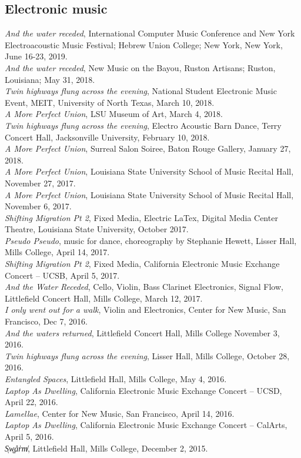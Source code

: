 \documentclass[10pt, a4paper]{article}
\newcommand{\years}[1]{\marginnote{\scriptsize #1}}
\begin{document}
\subsection*{Electronic music}
\years{2019} \textit{And the water receded}, International Computer Music Conference and New York Electroacoustic Music Festival; Hebrew Union College; New York, New York, June 16-23, 2019. \\
\years{2018} \textit{And the water receded}, New Music on the Bayou, Ruston Artisans; Ruston, Louisiana; May 31, 2018. \\  
\textit{Twin highways flung across the evening}, National Student Electronic Music Event, MEIT, University of North Texas, March 10, 2018. \\
\textit{A More Perfect Union}, LSU Museum of Art, March 4, 2018. \\
\textit{Twin highways flung across the evening}, Electro Acoustic Barn Dance, Terry Concert Hall, Jacksonville University, February 10, 2018. \\
\textit{A More Perfect Union}, Surreal Salon Soiree, Baton Rouge Gallery, January 27, 2018.\\
\years{2017}\textit{A  More Perfect Union}, Louisiana State University School of Music Recital Hall, November 27, 2017. \\
\textit{A More Perfect Union}, Louisiana State University School of Music Recital Hall, November 6, 2017.\\
\textit{Shifting Migration Pt 2}, Fixed Media, Electric LaTex, Digital Media Center Theatre, Louisiana State University, October 2017.\\
\textit{Pseudo Pseudo}, music for dance, choreography by Stephanie Hewett, Lisser Hall, Mills College, April 14, 2017. \\
\textit{Shifting Migration Pt 2}, Fixed Media, California Electronic Music Exchange Concert – UCSB, April 5, 2017.\\
\textit{And the Water Receded}, Cello, Violin, Bass Clarinet Electronics, Signal Flow, Littlefield Concert Hall, Mills College, March 12, 2017.\\
\years{2016} \textit{I only went out for a walk}, Violin and Electronics, Center for New Music, San Francisco, Dec 7, 2016. \\
\textit{And the waters returned}, Littlefield Concert Hall, Mills College November 3, 2016.\\
\textit{Twin highways flung across the evening}, Lisser Hall, Mills College, October 28, 2016.\\
\textit{Entangled Spaces}, Littlefield Hall, Mills College, May 4, 2016.\\
\textit{Laptop As Dwelling}, California Electronic Music Exchange Concert – UCSD, April 22, 2016.\\
\textit{Lamellae}, Center for New Music, San Francisco, April 14, 2016. \\
\textit{Laptop As Dwelling}, California Electronic Music Exchange Concert – CalArts, April 5, 2016. \\
\years{2015} \textit{S̜w͚a̎r̍m̸}, Littlefield Hall, Mills College, December 2, 2015. \\
\end{document}
